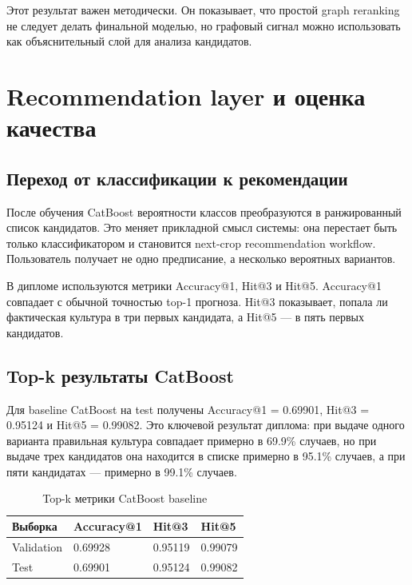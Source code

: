 \documentclass[a4paper,article,14pt]{extarticle}
\begin{document}
Этот результат важен методически. Он показывает, что простой graph reranking не следует делать финальной моделью, но графовый сигнал можно использовать как объяснительный слой для анализа кандидатов.

\section{Recommendation layer и оценка качества}

\subsection{Переход от классификации к рекомендации}

После обучения CatBoost вероятности классов преобразуются в ранжированный список кандидатов. Это меняет прикладной смысл системы: она перестает быть только классификатором и становится next-crop recommendation workflow. Пользователь получает не одно предписание, а несколько вероятных вариантов.

В дипломе используются метрики Accuracy@1, Hit@3 и Hit@5. Accuracy@1 совпадает с обычной точностью top-1 прогноза. Hit@3 показывает, попала ли фактическая культура в три первых кандидата, а Hit@5 --- в пять первых кандидатов.

\subsection{Top-k результаты CatBoost}

Для baseline CatBoost на test получены Accuracy@1 = 0.69901, Hit@3 = 0.95124 и Hit@5 = 0.99082. Это ключевой результат диплома: при выдаче одного варианта правильная культура совпадает примерно в 69.9\% случаев, но при выдаче трех кандидатов она находится в списке примерно в 95.1\% случаев, а при пяти кандидатах --- примерно в 99.1\% случаев.

\begin{center}
\begin{longtable}{|p{4cm}|p{3cm}|p{3cm}|p{3cm}|}
\caption{Top-k метрики CatBoost baseline}\\
\hline
Выборка & Accuracy@1 & Hit@3 & Hit@5\\
\hline
Validation & 0.69928 & 0.95119 & 0.99079\\
\hline
Test & 0.69901 & 0.95124 & 0.99082\\
\hline
\end{longtable}
\end{center}
\end{document}
